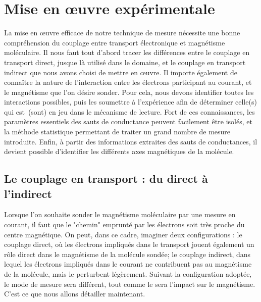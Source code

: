 \chapter{Mise en œuvre expérimentale}

La mise en œuvre efficace de notre technique de mesure nécessite une bonne compréhension du couplage entre transport électronique et magnétisme moléculaire. Il nous faut tout d'abord tracer les différences entre le couplage en transport direct, jusque là utilisé dans le domaine, et le couplage en transport indirect que nous avons choisi de mettre en œuvre. Il importe également de connaître la nature de l'interaction entre les électrons participant au courant, et le magnétisme que l'on désire sonder. Pour cela, nous devons identifier toutes les interactions possibles, puis les soumettre à l'expérience afin de déterminer celle(s) qui est~(sont) en jeu dans le mécanisme de lecture. Fort de ces connaissances, les paramètres essentiels des sauts de conductance peuvent facilement être isolés, et la méthode statistique permettant de traiter un grand nombre de mesure introduite. Enfin, à partir des informations extraites des sauts de conductances, il devient possible d'identifier les différents axes magnétiques de la molécule.

\section{Le couplage en transport : du direct à l'indirect}

Lorsque l'on souhaite sonder le magnétisme moléculaire par une mesure en courant, il faut que le "chemin" emprunté par les électrons soit très proche du centre magnétique. On peut, dans ce cadre, imaginer deux configurations : le couplage direct, où les électrons impliqués dans le transport jouent également un rôle direct dans le magnétisme de la molécule sondée; le couplage indirect, dans lequel les électrons impliqués dans le courant ne contribuent pas au magnétisme de la molécule, mais le perturbent légèrement. Suivant la configuration adoptée, le mode de mesure sera différent, tout comme le sera l'impact sur le magnétisme. C'est ce que nous allons détailler maintenant.

